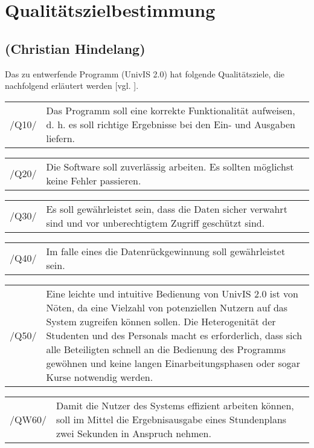 \section{Qualitätszielbestimmung}
\label{sec:Qualitätszielbestimmung}

\subsection*{(Christian Hindelang)}

Das zu entwerfende Programm (UnivIS 2.0) hat folgende Qualitätsziele, die nachfolgend erläutert werden [vgl. \cite{UniRos12a}]. 

\begin{tabular}{p{1.5cm}p{14.5cm}}
 /Q10/	& Das Programm soll eine korrekte Funktionalität aufweisen, d. h. es soll richtige Ergebnisse bei den Ein- und Ausgaben liefern. \\[0.25cm]	 
\end{tabular}

\begin{tabular}{p{1.5cm}p{14.5cm}}
 /Q20/	& Die Software soll zuverlässig arbeiten. Es sollten möglichst keine Fehler passieren. \\[0.25cm]	 
 \end{tabular}

\begin{tabular}{p{1.5cm}p{14.5cm}}
 /Q30/	& Es soll gewährleistet sein, dass die Daten sicher verwahrt sind und vor unberechtigtem Zugriff geschützt sind. \\[0.25cm]	 
\end{tabular}

\begin{tabular}{p{1.5cm}p{14.5cm}}
 /Q40/	& Im falle eines die Datenrückgewinnung soll gewährleistet sein. \\[0.25cm]	 
\end{tabular}

\begin{tabular}{p{1.5cm}p{14.5cm}}
 /Q50/	& Eine leichte und intuitive Bedienung von UnivIS 2.0 ist von Nöten, da eine Vielzahl von potenziellen Nutzern auf das System zugreifen können sollen. Die Heterogenität der Studenten und des Personals macht es erforderlich, dass sich alle Beteiligten schnell an die Bedienung des Programms gewöhnen und keine langen Einarbeitungsphasen oder sogar Kurse notwendig werden. \\[0.25cm]	 
\end{tabular}

\begin{tabular}{p{1.5cm}p{14.5cm}}
 /QW60/	& Damit die Nutzer des Systems effizient arbeiten können, soll im Mittel die Ergebnisausgabe eines Stundenplans zwei Sekunden in Anspruch nehmen. \\[0.25cm]	 
\end{tabular}

